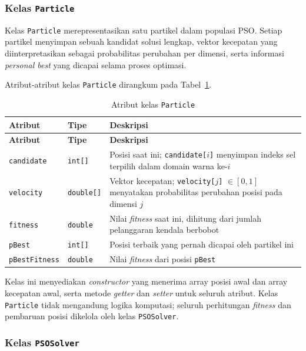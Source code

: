 \subsubsection{Kelas \texttt{Particle}}
\label{subsubsec:kelas-particle}

Kelas \texttt{Particle} merepresentasikan satu partikel dalam populasi PSO. Setiap partikel menyimpan sebuah kandidat solusi lengkap, vektor kecepatan yang diinterpretasikan sebagai probabilitas perubahan per dimensi, serta informasi \textit{personal best} yang dicapai selama proses optimasi.

Atribut-atribut kelas \texttt{Particle} dirangkum pada Tabel~\ref{tab:attr-particle}.

\begin{longtable}{llp{6cm}}
	\caption{Atribut kelas \texttt{Particle}}
	\label{tab:attr-particle} \\
	\toprule
	\textbf{Atribut} & \textbf{Tipe} & \textbf{Deskripsi} \\
	\midrule
	\endfirsthead
	\toprule
	\textbf{Atribut} & \textbf{Tipe} & \textbf{Deskripsi} \\
	\midrule
	\endhead
	\bottomrule
	\endfoot
	\texttt{candidate} & \texttt{int[]} & Posisi saat ini; \texttt{candidate[$i$]} menyimpan indeks sel terpilih dalam domain warna ke-$i$ \\
	\midrule
	\texttt{velocity} & \texttt{double[]} & Vektor kecepatan; \texttt{velocity[$j$]} $\in [0, 1]$ menyatakan probabilitas perubahan posisi pada dimensi $j$ \\
	\midrule
	\texttt{fitness} & \texttt{double} & Nilai \textit{fitness} saat ini, dihitung dari jumlah pelanggaran kendala berbobot \\
	\midrule
	\texttt{pBest} & \texttt{int[]} & Posisi terbaik yang pernah dicapai oleh partikel ini \\
	\midrule
	\texttt{pBestFitness} & \texttt{double} & Nilai \textit{fitness} dari posisi \texttt{pBest} \\
	\bottomrule
\end{longtable}

Kelas ini menyediakan \textit{constructor} yang menerima array posisi awal dan array kecepatan awal, serta metode \textit{getter} dan \textit{setter} untuk seluruh atribut. Kelas \texttt{Particle} tidak mengandung logika komputasi; seluruh perhitungan \textit{fitness} dan pembaruan posisi dikelola oleh kelas \texttt{PSOSolver}.

\subsubsection{Kelas \texttt{PSOSolver}}
\label{subsubsec:kelas-psosolver}

